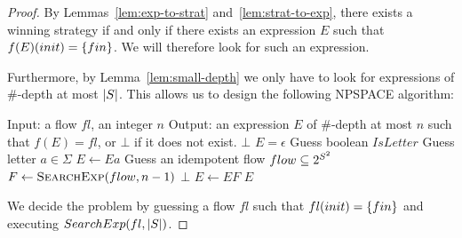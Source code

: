 \documentclass{article}
\begin{document}
\begin{proof}
	By Lemmas~\ref{lem:exp-to-strat} and~\ref{lem:strat-to-exp}, there exists a winning strategy if and only if there exists an expression $E$ such that $f(E)(init) = \{ fin \}$.
	We will therefore look for such an expression. 
	
	Furthermore, by Lemma~\ref{lem:small-depth} we only have to look for expressions of $\#$-depth at most $|S|$. This allows us to design the following NPSPACE algorithm: 
	
	\begin{algorithmic}
		\State Input: a flow $fl$, an integer $n$
		\State Output: an expression $E$ of $\#$-depth at most $n$ such that $f(E) = fl$, or $\bot$ if it does not exist. 
			\Return $\bot$
		\EndIf
		\State $E = \epsilon$
			\State Guess boolean $IsLetter$
				\State Guess letter $a \in \Sigma$ 
				\State $E \gets Ea$ 
			\Else
				\State Guess an idempotent flow $flow \subseteq 2^{S^2}$
				\State $F \gets \Call{SearchExp}{flow, n-1}$
					\Return $\bot$
				\EndIf 
				\State $E \gets EF$
			\EndIf
		\EndWhile
		\Return $E$
		\EndFunction
	\end{algorithmic}

We decide the problem by guessing a flow $fl$ such that $fl(init) = \{ fin \}$ and executing $\sc{SearchExp}(fl, |S|)$.
\end{proof}
\end{document}

